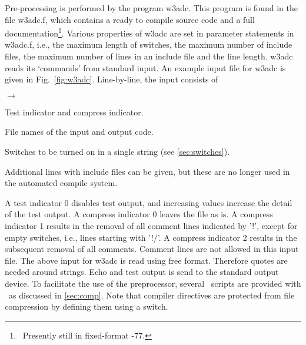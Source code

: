 \pb
\noindent
Pre-processing is performed by the program {\code w3adc}. This program is
found in the file {\file w3adc.f}, which contains a ready to compile
{\fortran} source code and a full documentation\footnote{~Presently still in
  fixed-format {\fortran}-77.}. Various properties of {\code w3adc} are set in
{\F parameter} statements in {\file w3adc.f}, i.e., the maximum length of
switches, the maximum number of include files, the maximum number of lines in
an include file and the line length. {\code w3adc} reads its `commands' from
standard input. An example input file for {\code w3adc} is given in
Fig.~\ref{fig:w3adc}. Line-by-line, the input consists of

\begin{list}{$\rightarrow$}{\itemsep 0mm \parsep 0mm}
\item	Test indicator and compress indicator.
\item	File names of the input and output code.
\item	Switches to be turned on in a single string (see
          \para\ref{sec:switches}).
\item   Additional lines with include files can be given, but these are no
        longer used in the automated compile system.
\end{list}




\noindent
A test indicator 0 disables test output, and increasing values increase the
detail of the test output. A compress indicator 0 leaves the file as is. A
compress indicator 1 results in the removal of all comment lines indicated by
'{\F !}', except for empty switches, i.e., lines starting with '{\F !/}'. A
compress indicator 2 results in the subsequent removal of all comments.
Comment lines are not allowed in this input file. The above input for {\F
w3adc} is read using free format. Therefore quotes are needed around
strings. Echo and test output is send to the standard output device. To
facilitate the use of the preprocessor, several \unix\ scripts are provided
with \ws\ as discussed in \para\ref{sec:comp}. Note that compiler directives
are protected from file compression by defining them using a switch.

